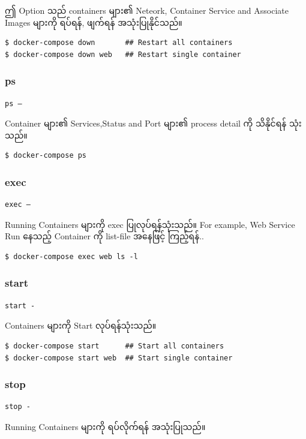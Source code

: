 \documentclass{article}
\begin{document}
ဤ Option သည် containers များ၏ Neteork, Container Service and Associate Images များကို ရပ်ရန်, ဖျက်ရန် အသုံးပြုနိုင်သည်။ 

\begin{verbatim}
$ docker-compose down       ## Restart all containers 
$ docker-compose down web   ## Restart single container
\end{verbatim}

\subsubsection{ps}\label{ps}
\begin{verbatim}
ps –
\end{verbatim}
Container များ၏ Services,Status and Port များ၏ process detail ကို သိနိုင်ရန် သုံးသည်။
        

\begin{verbatim}
$ docker-compose ps
\end{verbatim}

\subsubsection{exec}\label{exec}
\begin{verbatim}
exec –
\end{verbatim}
Running Containers များကို exec ပြုလုပ်ရန်သုံးသည်။ For example, Web Service Run နေသည့် Container ကို list-file အနေဖြင့် ကြည့်ရန်..

\begin{verbatim}
$ docker-compose exec web ls -l
\end{verbatim}

\subsubsection{start}\label{start}
\begin{verbatim}
start -
\end{verbatim}
Containers များကို Start လုပ်ရန်သုံးသည်။

\begin{verbatim}
$ docker-compose start      ## Start all containers 
$ docker-compose start web  ## Start single container
\end{verbatim}

\subsubsection{stop}\label{stop}
\begin{verbatim}
stop -
\end{verbatim}
Running Containers များကို ရပ်လိုက်ရန် အသုံးပြုသည်။ 
\end{document}
